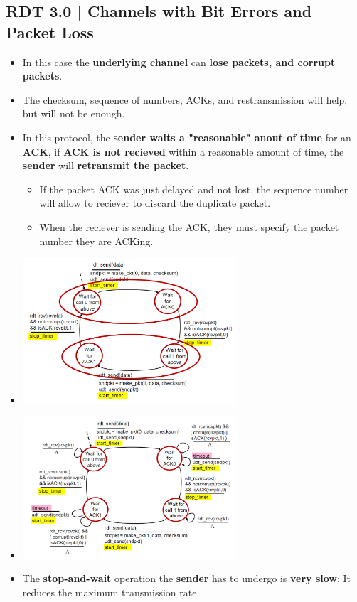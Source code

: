 \documentclass{article}
\begin{document}
    \subsection*{RDT 3.0 | Channels with Bit Errors and Packet Loss}
    \begin{itemize}
        \item In this case the \textbf{underlying channel} can \textbf{lose packets, and corrupt packets}.
        \item The checksum, sequence of numbers, ACKs, and restransmission will help, but will not be enough.
        \item In this protocol, the \textbf{sender waits a "reasonable" anout of time} for an \textbf{ACK}, if \textbf{ACK is not recieved} within a reasonable amount of time, the \textbf{sender} will \textbf{retransmit the packet}.
        \begin{itemize}
            \item If the packet ACK was just delayed and not lost, the sequence number will allow to reciever to discard the duplicate packet.
            \item When the reciever is sending the ACK, they must specify the packet number they are ACKing.
        \end{itemize}
        \item[] \begin{center}
                    \includegraphics*[width=300px]{images/RDT-3.0.PNG} 
                \end{center}
        \item[] \begin{center}
                    \includegraphics*[width=300px]{images/RDT-3.0-1.PNG} 
                \end{center}
        \item The \textbf{stop-and-wait} operation the \textbf{sender} has to undergo is \textbf{very slow}; It reduces the maximum transmission rate.
    \end{itemize}
\end{document}
